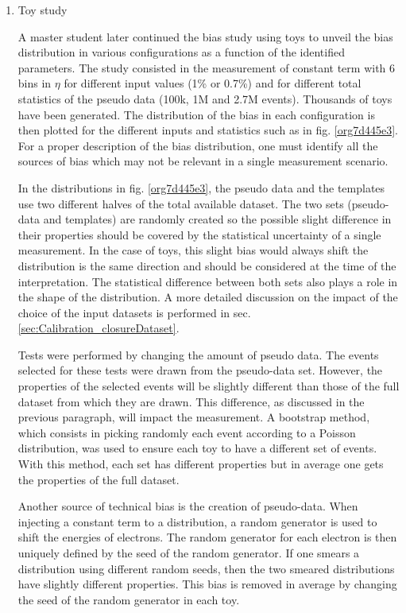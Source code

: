 \begin{enumerate}
\item Toy study
\label{sec:org74f4c79}

A master student later continued the bias study using toys to unveil the bias distribution in various configurations as a function of the identified parameters.
The study consisted in the measurement of constant term with 6 bins in $\eta$ for different input values (1\% or 0.7\%) and for different total statistics of the pseudo data (100k, 1M and 2.7M events).
Thousands of toys have been generated.
The distribution of the bias in each configuration is then plotted for the different inputs and statistics such as in fig. \ref{org7d445e3}.
For a proper description of the bias distribution, one must identify all the sources of bias which may not be relevant in a single measurement scenario.

In the distributions in fig. \ref{org7d445e3}, the pseudo data and the templates use two different halves of the total available dataset.
The two sets (pseudo-data and templates) are randomly created so the possible slight difference in their properties should be covered by the statistical uncertainty of a single measurement.
In the case of toys, this slight bias would always shift the distribution is the same direction and should be considered at the time of the interpretation.
The statistical difference between both sets also plays a role in the shape of the distribution.
A more detailed discussion on the impact of the choice of the input datasets is performed in sec. \ref{sec:Calibration_closureDataset}.

Tests were performed by changing the amount of pseudo data.
The events selected for these tests were drawn from the pseudo-data set.
However, the properties of the selected events will be slightly different than those of the full dataset from which they are drawn.
This difference, as discussed in the previous paragraph, will impact the measurement.
A bootstrap method, which consists in picking randomly each event according to a Poisson distribution, was used to ensure each toy to have a different set of events.
With this method, each set has different properties but in average one gets the properties of the full dataset.

Another source of technical bias is the creation of pseudo-data.
When injecting a constant term to a distribution, a random generator is used to shift the energies of electrons.
The random generator for each electron is then uniquely defined by the seed of the random generator.
If one smears a distribution using different random seeds, then the two smeared distributions have slightly different properties.
This bias is removed in average by changing the seed of the random generator in each toy.


\end{enumerate}

